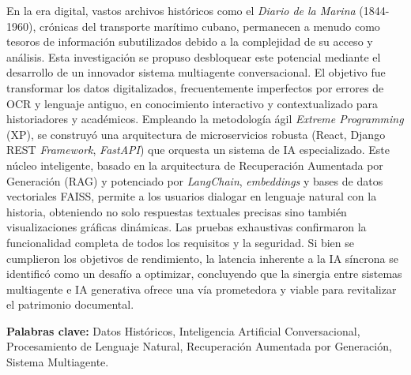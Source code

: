 \resumen

\parskip 10pt  \setlength{\parindent}{0pc}

En la era digital, vastos archivos históricos como el \textit{Diario de la Marina} (1844-1960), crónicas del transporte marítimo cubano, permanecen a menudo como tesoros de información subutilizados debido a la complejidad de su acceso y análisis. Esta investigación se propuso desbloquear este potencial mediante el desarrollo de un innovador sistema multiagente conversacional. El objetivo fue transformar los datos digitalizados, frecuentemente imperfectos por errores de OCR y lenguaje antiguo, en conocimiento interactivo y contextualizado para historiadores y académicos. Empleando la metodología ágil \textit{Extreme Programming} (XP), se construyó una arquitectura de microservicios robusta (React, Django REST \textit{Framework}, \textit{FastAPI}) que orquesta un sistema de IA especializado. Este núcleo inteligente, basado en la arquitectura de Recuperación Aumentada por Generación (RAG) y potenciado por \textit{LangChain}, \textit{embeddings} y bases de datos vectoriales FAISS, permite a los usuarios dialogar en lenguaje natural con la historia, obteniendo no solo respuestas textuales precisas sino también visualizaciones gráficas dinámicas. Las pruebas exhaustivas confirmaron la funcionalidad completa de todos los requisitos y la seguridad. Si bien se cumplieron los objetivos de rendimiento, la latencia inherente a la IA síncrona se identificó como un desafío a optimizar, concluyendo que la sinergia entre sistemas multiagente e IA generativa ofrece una vía prometedora y viable para revitalizar el patrimonio documental.

\textbf{Palabras clave:} Datos Históricos, Inteligencia Artificial Conversacional, Procesamiento de Lenguaje Natural, Recuperación Aumentada por Generación, Sistema Multiagente.